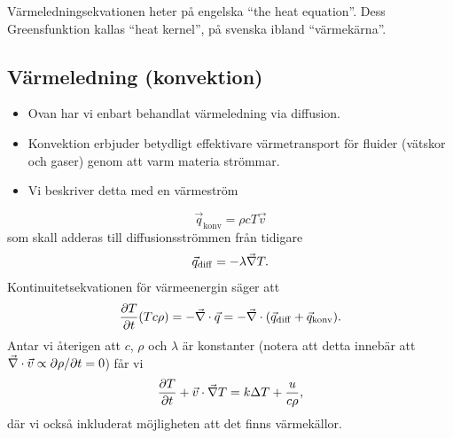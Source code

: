 \documentclass[%
oneside,                 %
final,                   %
10pt]{article}
\begin{document}
Värmeledningsekvationen heter på engelska ``the heat equation''. Dess Greensfunktion kallas ``heat kernel'', på svenska ibland ``värmekärna''.

\subsection*{Värmeledning (konvektion)}

\begin{itemize}
\item Ovan har vi enbart behandlat värmeledning via diffusion.

\item Konvektion erbjuder betydligt effektivare värmetransport för fluider (vätskor och gaser) genom att varm materia strömmar.

\item Vi beskriver detta med en värmeström
\end{itemize}

\noindent
$$
\vec{q}_\mathrm{konv} = \rho c T \vec{v}
$$
som skall adderas till diffusionsströmmen från tidigare
$$
\vec{q}_\mathrm{diff} = - \lambda \vec{\nabla} T.
$$
Kontinuitetsekvationen för värmeenergin säger att 
$$
\frac{\partial  T}{\partial t} (T c \rho) = -\vec{\nabla} \cdot \vec{q} = -\vec{\nabla} \cdot (\vec{q}_\mathrm{diff} + \vec{q}_\mathrm{konv}).
$$
Antar vi återigen att $c$, $\rho$ och $\lambda$ är konstanter (notera att detta innebär att $\vec{\nabla} \cdot \vec{v} \propto \partial \rho / \partial t = 0$) får vi
\begin{equation}
  \frac{\partial T}{\partial t} + \vec{v} \cdot \vec{\nabla} T = k \Delta  T + \frac{u}{c\rho},
\end{equation}
där vi också inkluderat möjligheten att det finns värmekällor.


\end{document}
